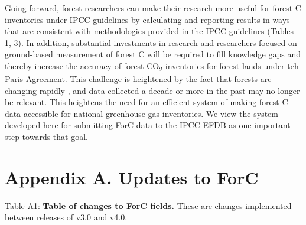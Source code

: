 \documentclass[, manuscript]{copernicus}
\begin{document}
Going forward, forest researchers can make their research more useful
for forest C inventories under IPCC guidelines by calculating and
reporting results in ways that are consistent with methodologies
provided in the IPCC guidelines (Tables 1, 3). In addition, substantial
investments in research and researchers focused on ground-based
measurement of forest C will be required to fill knowledge gaps and
thereby increase the accuracy of forest CO\textsubscript{2} inventories
for forest lands under teh Paris Agreement. This challenge is heightened
by the fact that forests are changing rapidly
\citep[e.g.,][]{mcdowell_pervasive_2020}, and data collected a decade or
more in the past may no longer be relevant. This heightens the need for
an efficient system of making forest C data accessible for national
greenhouse gas inventories. We view the system developed here for
submitting ForC data to the IPCC EFDB as one important step towards that
goal.

\clearpage

\section*{Appendix A. Updates to ForC}

\captionsetup[table]{labelformat=empty}

Table A1: \textbf{Table of changes to ForC fields.} These are changes
implemented between releases of v3.0 and v4.0.
\begingroup\fontsize{8}{10}\selectfont
\end{document}
